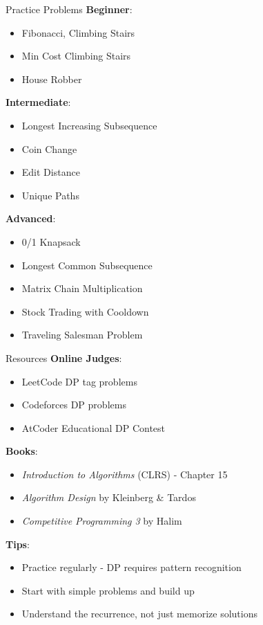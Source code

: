 \documentclass[aspectratio=169]{beamer}
\begin{document}
\begin{frame}{Practice Problems}
  \textbf{Beginner}:
  \begin{itemize}
    \item Fibonacci, Climbing Stairs
    \item Min Cost Climbing Stairs
    \item House Robber
  \end{itemize}

  \vspace{0.3cm}

  \textbf{Intermediate}:
  \begin{itemize}
    \item Longest Increasing Subsequence
    \item Coin Change
    \item Edit Distance
    \item Unique Paths
  \end{itemize}

  \vspace{0.3cm}

  \textbf{Advanced}:
  \begin{itemize}
    \item 0/1 Knapsack
    \item Longest Common Subsequence
    \item Matrix Chain Multiplication
    \item Stock Trading with Cooldown
    \item Traveling Salesman Problem
  \end{itemize}
\end{frame}

\begin{frame}{Resources}
  \textbf{Online Judges}:
  \begin{itemize}
    \item LeetCode DP tag problems
    \item Codeforces DP problems
    \item AtCoder Educational DP Contest
  \end{itemize}

  \vspace{0.5cm}

  \textbf{Books}:
  \begin{itemize}
    \item \textit{Introduction to Algorithms} (CLRS) - Chapter 15
    \item \textit{Algorithm Design} by Kleinberg \& Tardos
    \item \textit{Competitive Programming 3} by Halim
  \end{itemize}

  \vspace{0.5cm}

  \textbf{Tips}:
  \begin{itemize}
    \item Practice regularly - DP requires pattern recognition
    \item Start with simple problems and build up
    \item Understand the recurrence, not just memorize solutions
  \end{itemize}
\end{frame}
\end{document}
